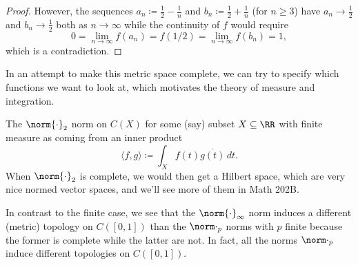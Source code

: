 \documentclass[../notes.tex]{subfiles}
\begin{document}
\begin{proof}
	However, the sequences $a_n\coloneqq\frac12-\frac1n$ and $b_n\coloneqq\frac12+\frac1n$ (for $n\ge3$) have $a_n\to\frac12$ and $b_n\to\frac12$ both as $n\to\infty$ while the continuity of $f$ would require
	\[0=\lim_{n\to\infty}f(a_n)=f(1/2)=\lim_{n\to\infty}f(b_n)=1,\]
	which is a contradiction.
\end{proof}
\begin{remark}
	In an attempt to make this metric space complete, we can try to specify which functions we want to look at, which motivates the theory of measure and integration.
\end{remark}
\begin{remark}
	The $\norm{\cdot}_2$ norm on $C(X)$ for some (say) subset $X\subseteq\RR$ with finite measure as coming from an inner product
	\[\langle f,g\rangle\coloneqq\int_Xf(t)\overline{g(t)}\,dt.\]
	When $\norm{\cdot}_2$ is complete, we would then get a Hilbert space, which are very nice normed vector spaces, and we'll see more of them in Math 202B.
\end{remark}
\begin{remark}[Nir]
	In contrast to the finite case, we see that the $\norm{\cdot}_\infty$ norm induces a different (metric) topology on $C([0,1])$ than the $\norm\cdot_p$ norms with $p$ finite because the former is complete while the latter are not. In fact, all the norms $\norm\cdot_p$ induce different topologies on $C([0,1])$.
\end{remark}
\end{document}
